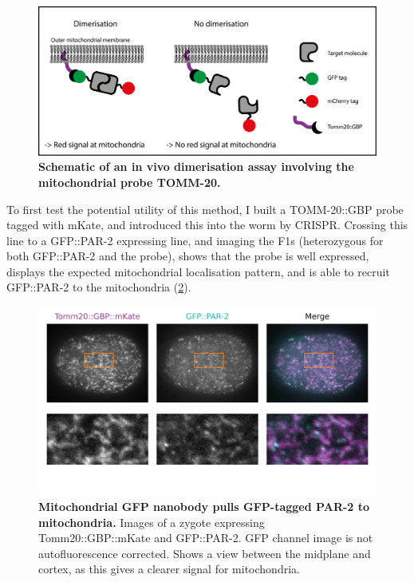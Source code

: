 \documentclass[12pt]{"report"}
\newcommand{\mycaption}[2]{\caption[#1]{\textbf{#1.} #2}}
\begin{document}
\begin{figure}
\includegraphics[scale=0.95]{tomm20_schematic}
\centering
\mycaption{Schematic of an in vivo dimerisation assay involving the mitochondrial probe TOMM-20}{
}
\label{fig:tomm20_schematic}
\end{figure}

To first test the potential utility of this method, I built a TOMM-20::GBP probe tagged with mKate, and introduced this into the worm by CRISPR. Crossing this line to a GFP::PAR-2 expressing line, and imaging the F1s (heterozygous for both GFP::PAR-2 and the probe), shows that the probe is well expressed, displays the expected mitochondrial localisation pattern, and is able to recruit GFP::PAR-2 to the mitochondria (\cref{fig:tomm20_merge}).\\

\begin{figure}
\includegraphics[scale=0.95]{tomm20_merge}
\centering
\mycaption{Mitochondrial GFP nanobody pulls GFP-tagged PAR-2 to mitochondria}{
Images of a zygote expressing Tomm20::GBP::mKate and GFP::PAR-2.
GFP channel image is not autofluorescence corrected. Shows a view between the midplane and cortex, as this gives a clearer signal for mitochondria.
}
\label{fig:tomm20_merge}
\end{figure}
\end{document}
